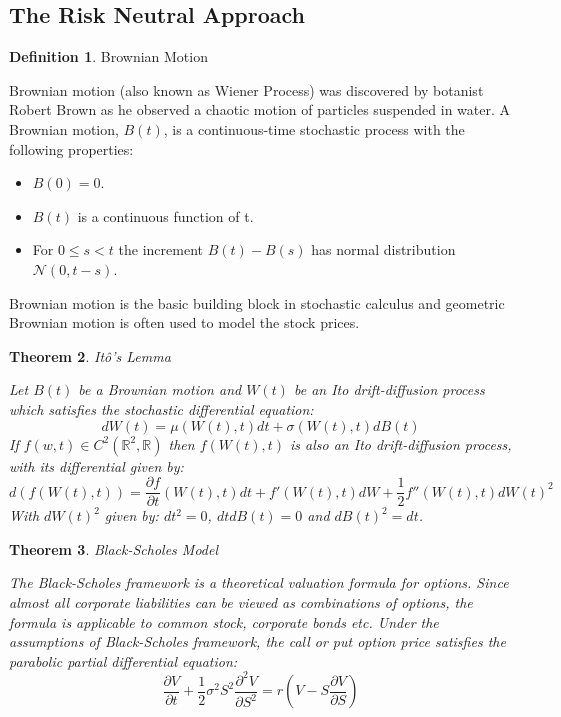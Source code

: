 \documentclass[12pt, oneside]{book}
\theoremstyle{plain}
\newtheorem{theorem}{Theorem}[section]
\theoremstyle{definition}
\newtheorem{definition}[theorem]{Definition}
\begin{document}
\subsection{The Risk Neutral Approach}
\begin{definition} Brownian Motion 

Brownian motion (also known as Wiener Process) was discovered by botanist Robert Brown as he observed a chaotic motion of particles suspended in water. \cite{BM}  A  Brownian  motion, $B(t)$,  is  a  continuous-time  stochastic  process  with  the  following properties: 
\begin{itemize}
\item $ B(0) = 0 $.
\item $ B(t) $ is a continuous function of t.
\item For $ 0  \leq s < t $ the increment $ B(t) -  B(s)  $ has normal distribution $ \mathcal{N}(0, t-s) $.
\end{itemize}
Brownian motion is the basic building block in stochastic calculus and geometric Brownian motion is often used to model the stock prices.

\end{definition}

\begin{theorem} It\^{o}'s Lemma

Let $B(t)$ be a Brownian motion and $W(t)$ be an Ito drift-diffusion process which satisfies the stochastic differential equation:
\begin{equation}
dW(t) = \mu(W(t),t)dt + \sigma(W(t),t)dB(t)
\end{equation} 
If $f(w, t) \in C^2(\mathbb{R}^2,\mathbb{R})$ then $f(W(t),t)$ is also an Ito drift-diffusion process, with its differential given by:
\begin{equation}
d(f(W(t),t)) = \frac{\partial f}{\partial t}(W(t),t)dt + f'(W(t),t)dW + \frac{1}{2}f''(W(t),t)dW(t)^2
\end{equation} 
With $dW(t)^2$ given by: $dt^2 = 0$, $dt dB(t) = 0$ and $dB(t)^2 = dt$.
\end{theorem}



\begin{theorem} Black-Scholes Model

The Black-Scholes framework is a theoretical valuation formula for options. Since almost all corporate liabilities can be viewed as combinations of options, the formula is applicable to common stock, corporate bonds etc.  \cite{BS} Under the assumptions of Black-Scholes framework, the call or put option price satisfies the parabolic partial differential equation:
\begin{equation}
\frac{\partial V}{\partial t} + \frac{1}{2}\sigma^2 S^2 \frac{\partial^2 V}{\partial S^2} = r(V - S \frac{\partial V}{\partial S})
\end{equation}

\end{theorem}  
\end{document}
